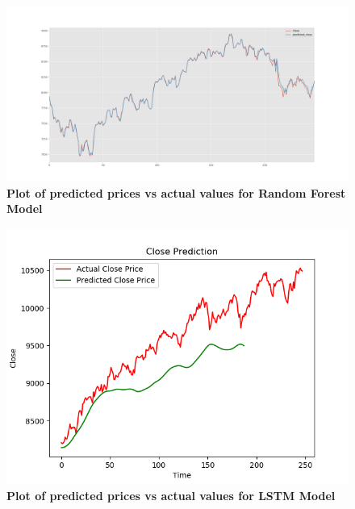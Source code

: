 \documentclass[BTech]{srmuthesis}
\begin{document}
\begin{figure}[H]
	\centering
	\includegraphics[width=\linewidth]{RF_OutputPlot.png}
	\caption{\bf Plot of predicted prices vs actual values for Random Forest Model}
	\label{fig:Output}
\end{figure}

\begin{figure}[H]
	\centering
	\includegraphics[width=\linewidth]{LSTM_Final.png}
	\caption{\bf Plot of predicted prices vs actual values for LSTM Model}
	\label{fig:LSTM_Output}
\end{figure} 
\end{document}

